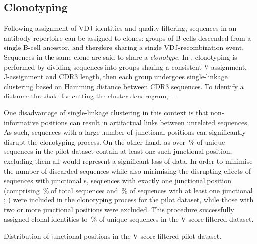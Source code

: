 \subsection{Clonotyping} %
\label{sec:igseq_pilot_clones}

Following assignment of VDJ identities and quality filtering, sequences in an antibody repertoire can be assigned to clones: groups of B-cells descended from a single \naive B-cell ancestor, and therefore sharing a single VDJ-recombination event. Sequences in the same clone are said to share a \textit{clonotype}. In , clonotyping is performed by dividing sequences into groups sharing a consistent V-assignment, J-assignment and CDR3 length, then each group undergoes single-linkage clustering based on Hamming distance between CDR3 sequences. To identify a distance threshold for cutting the cluster dendrogram, ... %

One disadvantage of single-linkage clustering in this context is that non-informative  positions can result in artifactual links between unrelated sequences. As such, sequences with a large number of junctional  positions can significantly disrupt the clonotyping process. On the other hand, as over \,\% of unique sequences in the pilot dataset contain at least one such junctional  position, excluding them all would represent a significant loss of data. In order to minimise the number of discarded sequences while also minimising the disrupting effects of sequences with junctional s, sequences with exactly one junctional  position (comprising \,\% of total sequences and \,\% of sequences with at least one junctional ; ) were included in the clonotyping process for the pilot dataset, while those with two or more junctional  positions were excluded. This procedure successfully assigned clonal identities to \,\% of unique sequences in the V-score-filtered dataset.

\begin{table}
\caption{Distribution of junctional  positions in the V-score-filtered pilot dataset.}
\label{tab:igseq-pilot-filtered-nn}

\end{table}

